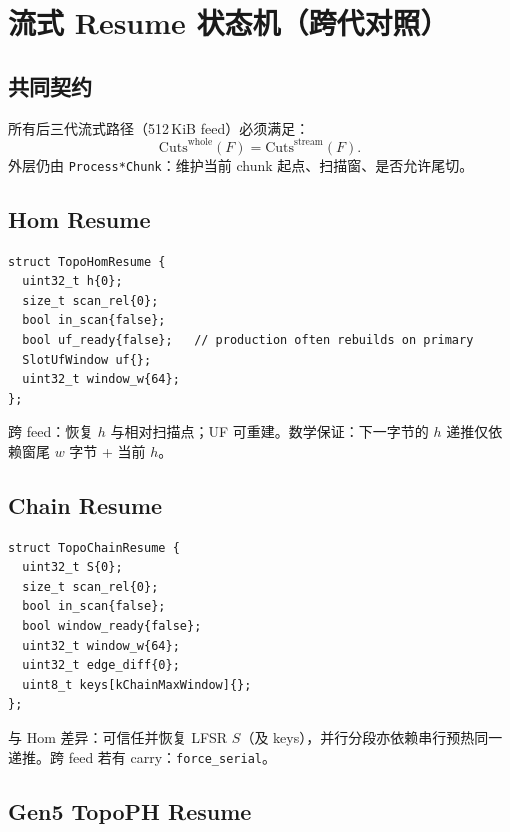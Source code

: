 \chapter{流式 Resume 状态机（跨代对照）}
\label{ch:streaming}

\section{共同契约}

所有后三代流式路径（512\,KiB feed）必须满足：
\begin{equation}
\mathrm{Cuts}^{\mathrm{whole}}(F)=\mathrm{Cuts}^{\mathrm{stream}}(F).
\end{equation}
外层仍由 \texttt{Process*Chunk}：维护当前 chunk 起点、扫描窗、是否允许尾切。

\section{Hom Resume}

\begin{lstlisting}[caption={TopoHomResume},label={lst:hom-resume-full}]
struct TopoHomResume {
  uint32_t h{0};
  size_t scan_rel{0};
  bool in_scan{false};
  bool uf_ready{false};   // production often rebuilds on primary
  SlotUfWindow uf{};
  uint32_t window_w{64};
};
\end{lstlisting}

跨 feed：恢复 $h$ 与相对扫描点；UF 可重建。数学保证：下一字节的 $h$ 递推仅依赖窗尾 $w$ 字节 + 当前 $h$。

\section{Chain Resume}

\begin{lstlisting}[caption={TopoChainResume（含 $S$）},label={lst:chain-resume-full}]
struct TopoChainResume {
  uint32_t S{0};
  size_t scan_rel{0};
  bool in_scan{false};
  bool window_ready{false};
  uint32_t window_w{64};
  uint32_t edge_diff{0};
  uint8_t keys[kChainMaxWindow]{};
};
\end{lstlisting}

与 Hom 差异：可信任并恢复 LFSR $S$（及 keys），并行分段亦依赖串行预热同一递推。跨 feed 若有 carry：\texttt{force\_serial}。

\section{Gen5 TopoPH Resume}


